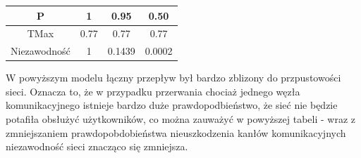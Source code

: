 \documentclass[titlepage]{article}
\begin{document}
\begin{table}[h!]
	\centering
    \label{tab:table5}
    \begin{tabular}{|c|c|c|c|}
    		\hline
      	P & 1 & 0.95 & 0.50\\
      	\hline
      	TMax & 0.77 & 0.77 & 0.77\\
      	\hline
      	Niezawodność & 1 & 0.1439 & 0.0002\\
		\hline
    \end{tabular}
\end{table}

W powyższym modelu łączny przepływ był bardzo zblizony do przpustowości sieci. Oznacza to, że w przypadku przerwania chociaż jednego węzła komunikacyjnego istnieje bardzo duże prawdopodbieństwo, że sieć nie będzie potafiła obsłużyć użytkowników, co można zauważyć w powyższej tabeli - wraz z zmniejszaniem prawdopobdobieństwa nieuszkodzenia kanłów komunikacyjnych niezawodność sieci znacząco się zmniejsza.
\end{document}

